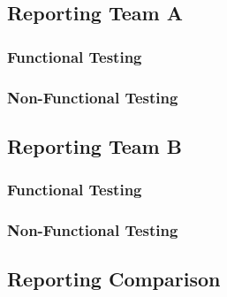 \documentclass[12pt, oneside]{article}
\begin{document}
	\subsection{Reporting Team A}	
		\subsubsection{Functional Testing}
			
		\subsubsection{Non-Functional Testing }
			
	
	\subsection{Reporting Team B}	
		\subsubsection{Functional Testing}
			
		\subsubsection{Non-Functional Testing }
			
	
	\subsection{Reporting Comparison}
\end{document}
